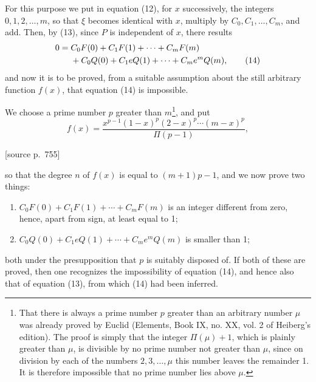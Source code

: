 \documentclass[11pt]{article}
\newcommand{\srcpage}[1]{\par\medskip\noindent\textsf{[source p.~#1]}\par\smallskip}
\begin{document}
For this purpose we put in equation (12), for $x$ successively, the integers $0,1,2,\ldots,m$, so that $\xi$ becomes identical with $x$, multiply by $C_0,C_1,\ldots,C_m$, and add. Then, by (13), since $P$ is independent of $x$, there results
\begin{align}
0={}&C_0F(0)+C_1F(1)+\cdots+C_mF(m)\notag\\
&+C_0Q(0)+C_1eQ(1)+\cdots+C_me^mQ(m),\tag{14}
\end{align}
and now it is to be proved, from a suitable assumption about the still arbitrary function $f(x)$, that equation (14) is impossible.

We choose a prime number $p$ greater than $m$\footnote{That there is always a prime number $p$ greater than an arbitrary number $\mu$ was already proved by Euclid (Elements, Book IX, no. XX, vol. 2 of Heiberg's edition). The proof is simply that the integer $\Pi(\mu)+1$, which is plainly greater than $\mu$, is divisible by no prime number not greater than $\mu$, since on division by each of the numbers $2,3,\ldots,\mu$ this number leaves the remainder 1. It is therefore impossible that no prime number lies above $\mu$.}, and put
\begin{equation}\tag{15}
f(x)=\frac{x^{p-1}(1-x)^p(2-x)^p\cdots(m-x)^p}{\Pi(p-1)},
\end{equation}
\srcpage{755}
so that the degree $n$ of $f(x)$ is equal to $(m+1)p-1$, and we now prove two things:
\begin{enumerate}[label=\arabic*)]
\item $C_0F(0)+C_1F(1)+\cdots+C_mF(m)$ is an integer different from zero, hence, apart from sign, at least equal to 1;
\item $C_0Q(0)+C_1eQ(1)+\cdots+C_me^mQ(m)$ is smaller than 1;
\end{enumerate}
both under the presupposition that $p$ is suitably disposed of. If both of these are proved, then one recognizes the impossibility of equation (14), and hence also that of equation (13), from which (14) had been inferred.
\end{document}
